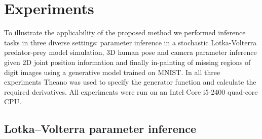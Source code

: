 \section{Experiments}\label{sec:experiments}

To illustrate the applicability of the proposed method we performed inference tasks in three diverse settings: parameter inference in a stochastic Lotka-Volterra predator-prey model simulation, 3D human pose and camera parameter inference given 2D joint position information and finally in-painting of missing regions of digit images using a generative model trained on MNIST. In all three experiments Theano \citep{theano2016theano} was used to specify the generator function and calculate the required derivatives. All experiments were run on an Intel Core i5-2400 quad-core CPU. %

\subsection{Lotka--Volterra parameter inference}

